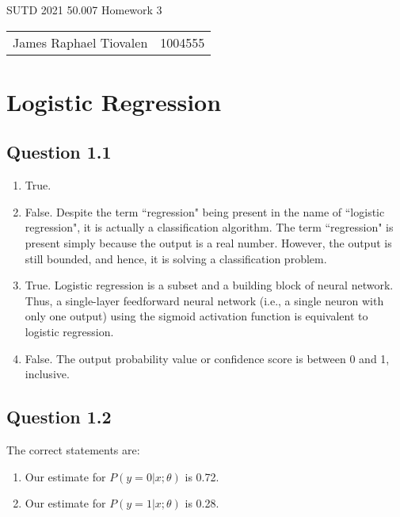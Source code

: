 \documentclass[11pt,fancychapters]{article}
\begin{document}
\centerline{\huge{SUTD 2021 50.007 Homework 3}}

\begin{table}[ht]
\centering
\footnotesize
 \begin{tabular}{c c} 
James Raphael Tiovalen & 1004555
 \end{tabular}
\end{table}

\section{Logistic Regression}

\subsection*{Question 1.1}

\begin{enumerate}[label=\textbf{\alph*)}]
	
\item True.

\item False. Despite the term ``regression" being present in the name of ``logistic regression", it is actually a classification algorithm. The term ``regression" is present simply because the output is a real number. However, the output is still bounded, and hence, it is solving a classification problem.

\item True. Logistic regression is a subset and a building block of neural network. Thus, a single-layer feedforward neural network (i.e., a single neuron with only one output) using the sigmoid activation function is equivalent to logistic regression.

\item False. The output probability value or confidence score is between 0 and 1, inclusive.

\end{enumerate}

\subsection*{Question 1.2}

The correct statements are:

\begin{enumerate}[label=\textbf{\arabic*)}]
	
\addtocounter{enumi}{1}
	
\item Our estimate for $P(y=0|x;\theta)$ is 0.72.

\item Our estimate for $P(y=1|x;\theta)$ is 0.28.
	
\end{enumerate}
\end{document}
